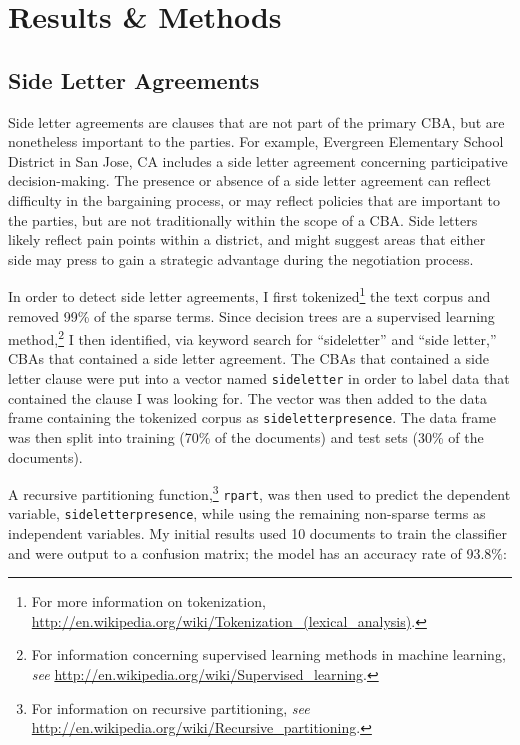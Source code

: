 \section{Results \& Methods}
\subsection{Side Letter Agreements}
Side letter agreements are clauses that are not part of the primary CBA, but are nonetheless important to the parties. For example, Evergreen Elementary School District in San Jose, CA includes a side letter agreement concerning participative decision-making. The presence or absence of a side letter agreement can reflect difficulty in the bargaining process, or may reflect policies that are important to the parties, but are not traditionally within the scope of a CBA. Side letters  likely reflect pain points within a district, and might suggest areas that either side may press to gain a strategic advantage during the negotiation process. 

In order to detect side letter agreements, I first tokenized\footnote{\hspace{2ex}For more information on tokenization,  \url{http://en.wikipedia.org/wiki/Tokenization_(lexical_analysis)}.} the text corpus and removed 99\% of the sparse terms. Since decision trees are a supervised learning method,\footnote{\hspace{2ex}For information concerning supervised learning methods in machine learning, \textit{see} \url{http://en.wikipedia.org/wiki/Supervised_learning}.} I then identified, via keyword search for “sideletter” and “side letter,” CBAs that contained a side letter agreement. The CBAs that contained a side letter clause were put into a vector named \texttt{sideletter} in order to label data that contained the clause I was looking for. The vector was then added to the data frame containing the tokenized corpus as \texttt{sideletterpresence}. The data frame was then split into training (70\% of the documents) and test sets (30\% of the documents).

A recursive partitioning function,\footnote{\hspace{2ex}For information on recursive partitioning, \textit{see} \url{http://en.wikipedia.org/wiki/Recursive_partitioning}.} \texttt{rpart}, was then used to predict the dependent variable, \texttt{sideletterpresence}, while using the remaining non-sparse terms as independent variables. My initial results used 10 documents to train the classifier and were output to a confusion matrix; the model has an accuracy rate of 93.8\%:

